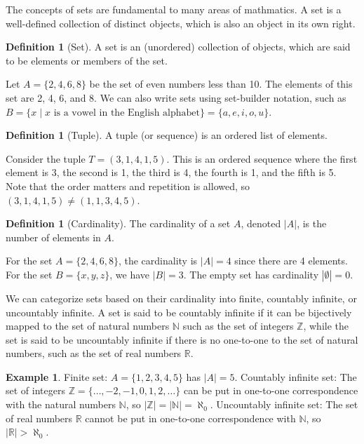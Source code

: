 \documentclass[12pt]{article}
\theoremstyle{definition}
\newtheorem{definition}[theorem]{Definition}
\newtheorem*{example}{Example}
\begin{document}
The concepts of sets are fundamental to many areas of mathmatics. A set is a well-defined collection of distinct objects, which is also an object in its own right. 

\begin{definition}[Set]
    A set is an (unordered) collection of objects, which are said to be elements or members of the set.
\end{definition}

Let $A = \{2, 4, 6, 8\}$ be the set of even numbers less than 10. The elements of this set are 2, 4, 6, and 8. We can also write sets using set-builder notation, such as $B = \{x \mid x \text{ is a vowel in the English alphabet}\} = \{a, e, i, o, u\}$.

\vspace{12pt}


\begin{definition}[Tuple]
    A tuple (or sequence) is an ordered list of elements. 
\end{definition}

Consider the tuple $T = (3, 1, 4, 1, 5)$. This is an ordered sequence where the first element is 3, the second is 1, the third is 4, the fourth is 1, and the fifth is 5. Note that the order matters and repetition is allowed, so $(3, 1, 4, 1, 5) \neq (1, 1, 3, 4, 5)$.


\vspace{12pt}


\begin{definition}[Cardinality]
    The cardinality of a set $A$, denoted $\vert A \vert$, is the number of elements in $A$.
\end{definition}

For the set $A = \{2, 4, 6, 8\}$, the cardinality is $|A| = 4$ since there are 4 elements. For the set $B = \{x, y, z\}$, we have $|B| = 3$. The empty set has cardinality $|\emptyset| = 0$.


We can categorize sets based on their cardinality into finite, countably infinite, or uncountably infinite. A set is said to be countably infinite if it can be bijectively mapped to the set of natural numbers $\mathbb{N}$ such as the set of integers $\mathbb{Z}$, while the set is said to be uncountably infinite if there is no one-to-one to the set of natural numbers, such as the set of real numbers $\mathbb{R}$.

\begin{example}
    Finite set: $A = \{1, 2, 3, 4, 5\}$ has $|A| = 5$.
    Countably infinite set: The set of integers $\mathbb{Z} = \{\ldots, -2, -1, 0, 1, 2, \ldots\}$ can be put in one-to-one correspondence with the natural numbers $\mathbb{N}$, so $|\mathbb{Z}| = |\mathbb{N}| = \aleph_0$.
    Uncountably infinite set: The set of real numbers $\mathbb{R}$ cannot be put in one-to-one correspondence with $\mathbb{N}$, so $|\mathbb{R}| > \aleph_0$.
\end{example}
\end{document}
